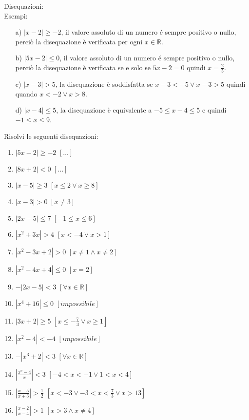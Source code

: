 Disequazioni:\\
Esempi:
\begin{enumerate}
        \item[a)] $|x-2|\geq -2$, il valore assoluto di un numero é sempre 
positivo o nullo, perciò la disequazione è verificata per ogni $x\in 
\mathbb{R}$.

        \item[b)] $|5x-2|\leq 0$, il valore assoluto di un numero é sempre 
positivo o nullo, perciò la disequazione è verificata se e solo se $5x-2=0$ 
quindi $x=\frac{2}{5}$.
        \item[c)] $|x-3|>5$, la disequazione è soddisfatta se $x-3<-5 \vee 
x-3>5$ quindi quando $x<-2 \vee x>8$.
        \item[d)] $|x-4|\leq 5$, la disequazione è equivalente a $-5\leq x-4 
\leq 5$ e quindi $-1\leq x \leq 9$.
\end{enumerate}

Risolvi le seguenti disequazioni:

\begin{enumerate}
\item $\left| 5x-2\right| \geq -2 $ \hfill $\left[ \dots \right] $
\item $\left| 8x+2\right| < 0 $ \hfill $\left[ \dots \right] $
\item $\left| x-5\right| \geq 3 $ \hfill $\left[ x\leq 2 \vee x\geq 8 \right] $
\item $\left| x-3\right| >0 $ \hfill $\left[ x\neq 3 \right] $
\item $\left| 2x-5\right| \leq 7 $ \hfill $\left[ -1\leq x \leq 6 \right] $
\item $\left| x^2+3x\right| >4 $ \hfill $\left[ x<-4 \vee x>1 \right] $
\item $\left| x^2-3x+2\right| >0 $ \hfill $\left[ x\neq 1 \wedge x\neq 2 \right] 
$
\item $\left| x^2-4x+4\right| \leq 0 $ \hfill $\left[ x=2 \right] $
\item $-\left| 2x-5\right| <3 $ \hfill $\left[ \forall x \in \mathbb{R} \right] 
$
\item $\left| x^4+16\right| \leq 0 $ \hfill $\left[ impossibile \right] $
\item $\left| 3x+2\right| \geq 5 $ \hfill $\left[ x\leq -\frac{7}{3} \vee x\geq 
1 \right] $
\item $\left| x^2-4\right| <-4 $ \hfill $\left[ impossibile \right] $
\item $-\left| x^3+2\right| <3 $ \hfill $\left[ \forall x \in \mathbb{R} \right] 
$
\item $\left| \frac{x^2-4}{x}\right| <3 $ \hfill $\left[ -4<x<-1 \vee 1<x<4 
\right] $
\item $\left| \frac{x-5}{x+3}\right| >\frac{1}{2} $ \hfill $\left[x<-3 \vee 
-3<x<\frac{7}{3} \vee x>13 \right] $
\item $\left| \frac{x-2}{x-4}\right| >1 $ \hfill $\left[x>3 \wedge x \neq 4 
\right] $
\end{enumerate}









